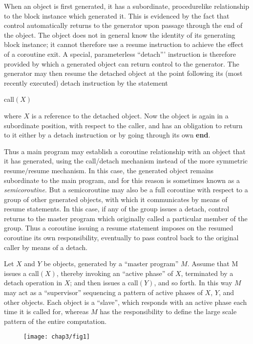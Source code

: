 When an object is first generated, it has a subordinate, procedurelike relationship to the block instance which generated it. This is evidenced by the fact that control automatically returns to the generator upon passage through the end of the object. The object does not in general know the identity of its generating block instance; it cannot therefore use a resume instruction to achieve the effect of a coroutine exit. A special, parameterless ``detach''' instruction is therefore provided by which a generated object can return control to the generator. The generator may then resume the detached object at the point following its (most recently executed) detach instruction by the
statement

\quad call$(X)$

\noindent
where $X$ is a reference to the detached object. Now the object is again in a subordinate position, with respect to the caller, and has an obligation to return to it either by a detach instruction or by going through its own \textbf{end}.

Thus a main program may establish a coroutine relationship with an object that it has generated, using the call/detach mechanism instead of the more symmetric resume$/$resume mechanism. In this case, the generated object remains subordinate to the main program, and for this reason is sometimes known as a \textit{semicoroutine}. But a semicoroutine may also be a full coroutine with respect to a group of other generated objects, with which it communicates by means of resume statements. In this case, if any of the group issues a detach, control returns to the master program which originally called a particular member of the group. Thus a coroutine issuing a resume statement imposes on the resumed coroutine its own responsibility, eventually to pass control back to the original caller by means of a detach.

Let $X$ and $Y$ be objects, generated by a ``master program'' $M$. Assume that M issues a call$(X)$, thereby invoking an ``active phase'' of $X$, terminated by a detach operation in $X$; and then issues a call$(Y)$, and so forth. In this way $M$ may act as a ``supervisor'' sequencing a pattern of active phases of $X$, $Y$, and other objects. Each object is a ``slave'', which responds with an active phase each time it is called for, whereas $M$ has the responsibility to define the large scale pattern of the entire computation.

\begin{figure}[h]
	\centering
	\texttt{[image: chap3/fig1]}
\end{figure}

